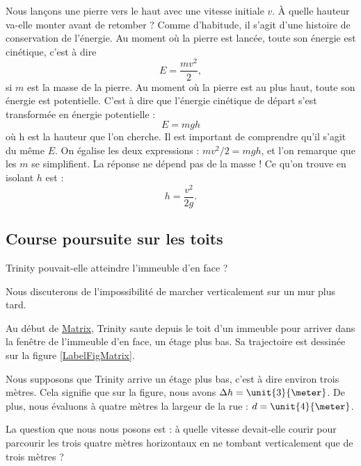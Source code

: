 Nous lançons une pierre vers le haut avec une vitesse initiale $v$. À quelle hauteur va-elle monter avant de retomber ? Comme d'habitude, il s'agit d'une histoire de conservation de l'énergie. Au moment où la pierre est lancée, toute son énergie est cinétique, c'est à dire
\[ 
  E=\frac{ mv^2 }{ 2 },
\]
si $m$ est la masse de la pierre. Au moment où la pierre est au plus haut, toute son énergie est potentielle. C'est à dire que l'énergie cinétique de départ s'est transformée en énergie potentielle :
\[ 
  E=mgh
\]
 où h est la hauteur que l'on cherche. Il est important de comprendre qu'il s'agit du même $E$. On égalise les deux expressions : $mv^2/2=mgh$, et l'on remarque que les $m$ se simplifient. La réponse ne dépend pas de la masse ! Ce qu'on trouve en isolant $h$ est :
\begin{equation}
h=\frac{ v^2 }{ 2g }.
\end{equation}  

\subsection{Course poursuite sur les toits}

\begin{pourquoidonc}
	Trinity pouvait-elle atteindre l'immeuble d'en face ? 
	
	Nous discuterons de l'impossibilité de marcher verticalement sur un mur plus tard.
\end{pourquoidonc}

Au début de \href{http://fr.wikipedia.org/wiki/Matrix}{Matrix}, Trinity saute depuis le toit d'un immeuble pour arriver dans la fenêtre de l'immeuble d'en face, un étage plus bas. Sa trajectoire est dessinée sur la figure \ref{LabelFigMatrix}.
\newcommand{\CaptionFigMatrix}{La trajectoire suivie par Trinity.}

Nous supposons que Trinity arrive un étage plus bas, c'est à dire environ trois mètres. Cela signifie que sur la figure, nous avons $\Delta h=\unit{3}{\meter}$. De plus, nous évaluons à quatre mètres la largeur de la rue : $d=\unit{4}{\meter}$.

La question que nous nous posons est : à quelle vitesse devait-elle courir pour parcourir les trois quatre mètres horizontaux en ne tombant verticalement que de trois mètres ?

